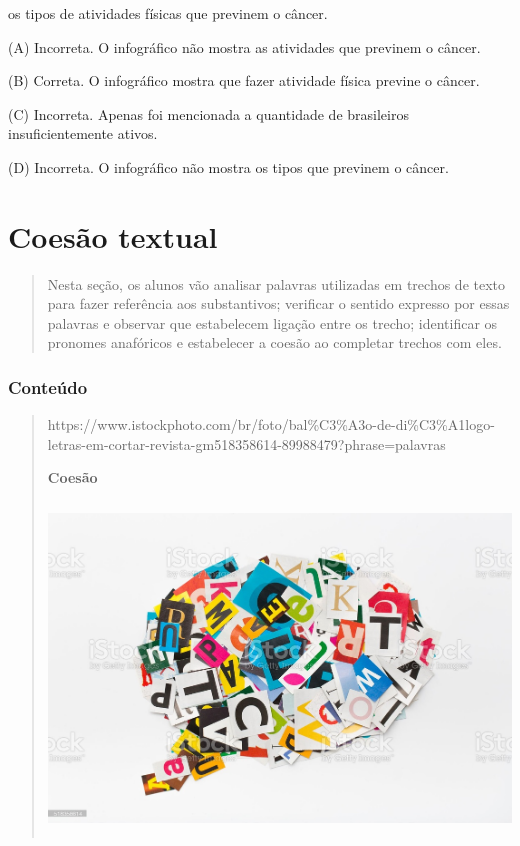 \begin{escolha}
\begin{escolha}
\item os tipos de atividades físicas que previnem o câncer.
\end{escolha}


(A) Incorreta. O infográfico não mostra as atividades que previnem o
câncer.

(B) Correta. O infográfico mostra que fazer atividade física previne o
câncer.

(C) Incorreta. Apenas foi mencionada a quantidade de brasileiros
insuficientemente ativos.

(D) Incorreta. O infográfico não mostra os tipos que previnem o câncer.

\chapter{Coesão textual}

\begin{quote}
Nesta seção, os alunos vão analisar palavras utilizadas em trechos de
texto para fazer referência aos substantivos; verificar o sentido
expresso por essas palavras e observar que estabelecem ligação entre os
trecho; identificar os pronomes anafóricos e estabelecer a coesão ao
completar trechos com eles.
\end{quote}

\subsection{Conteúdo}\label{conteuxfado-9}

\begin{quote}
https://www.istockphoto.com/br/foto/bal\%C3\%A3o-de-di\%C3\%A1logo-letras-em-cortar-revista-gm518358614-89988479?phrase=palavras

\textbf{Coesão }

\includegraphics[width=5.17173in,height=3.44883in]{media/image35.jpeg}


\end{quote}
\end{escolha}
